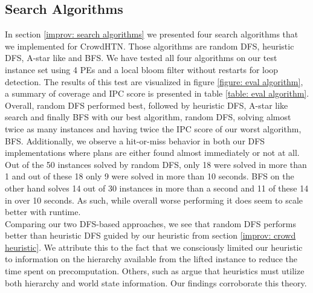\subsection{Search Algorithms}
\label{eval: algorithms}
In section \ref{improv: search algorithms} we presented four search algorithms that we implemented for CrowdHTN. Those algorithms are random DFS, heuristic DFS, A-star like and BFS. We have tested all four algorithms on our test instance set using 4 PEs and a local bloom filter without restarts for loop detection. The results of this test are visualized in figure \ref{figure: eval algorithm}, a summary of coverage and IPC score is presented in table \ref{table: eval algorithm}. \\
Overall, random DFS performed best, followed by heuristic DFS, A-star like search and finally BFS with our best algorithm, random DFS, solving almost twice as many instances and having twice the IPC score of our worst algorithm, BFS. Additionally, we observe a hit-or-miss behavior in both our DFS implementations where plans are either found almost immediately or not at all. Out of the 50 instances solved by random DFS, only 18 were solved in more than 1 and out of these 18 only 9 were solved in more than 10 seconds. BFS on the other hand solves 14 out of 30 instances in more than a second and 11 of these 14 in over 10 seconds. As such, while overall worse performing it does seem to scale better with runtime. \\
Comparing our two DFS-based approaches, we see that random DFS performs better than heuristic DFS guided by our heuristic from section \ref{improv: crowd heuristic}. We attribute this to the fact that we consciously limited our heuristic to information on the hierarchy available from the lifted instance to reduce the time spent on precomputation. Others, such as \cite{holler2020htn} argue that heuristics must utilize both hierarchy and world state information. Our findings corroborate this theory.

